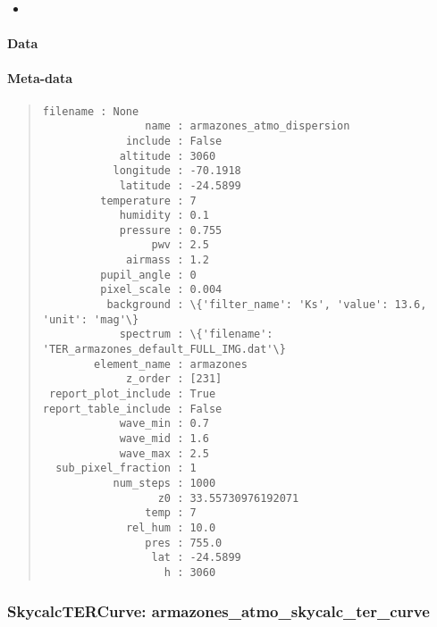 \begin{itemize}
\item \end{itemize}


\paragraph{Data%
  \label{id1}%
}

\begin{figure}[H]
\noindent{}\label{fig-armazones-atmo-dispersion}
\end{figure}


\paragraph{Meta-data%
  \label{id2}%
}

\begin{quote}
\begin{alltt}
\begin{lstlisting}[frame=single]
            filename : None
                name : armazones_atmo_dispersion
             include : False
            altitude : 3060
           longitude : -70.1918
            latitude : -24.5899
         temperature : 7
            humidity : 0.1
            pressure : 0.755
                 pwv : 2.5
             airmass : 1.2
         pupil_angle : 0
         pixel_scale : 0.004
          background : \{'filter_name': 'Ks', 'value': 13.6, 'unit': 'mag'\}
            spectrum : \{'filename': 'TER_armazones_default_FULL_IMG.dat'\}
        element_name : armazones
             z_order : [231]
 report_plot_include : True
report_table_include : False
            wave_min : 0.7
            wave_mid : 1.6
            wave_max : 2.5
  sub_pixel_fraction : 1
           num_steps : 1000
                  z0 : 33.55730976192071
                temp : 7
             rel_hum : 10.0
                pres : 755.0
                 lat : -24.5899
                   h : 3060
\end{lstlisting}
\end{alltt}
\end{quote}


\subsubsection{SkycalcTERCurve: \textquotedbl{}armazones\_atmo\_skycalc\_ter\_curve\textquotedbl{}%
  \label{skycalctercurve-armazones-atmo-skycalc-ter-curve}%
}

